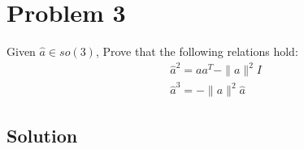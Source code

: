 \section*{Problem 3}

Given \(\hat{a} \in s o(3)\), Prove that the following relations hold:
\begin{align*}
     & \hat{a}^{2}=a a^{T}-\|a\|^{2} I \\
     & \hat{a}^{3}=-\|a\|^{2} \hat{a}
\end{align*}

\subsection*{Solution}
